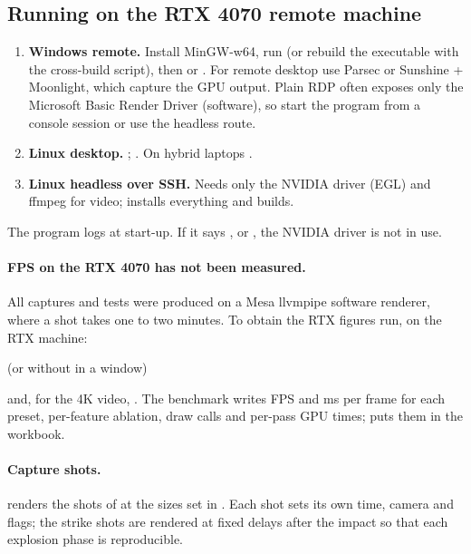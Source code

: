 \subsection{Running on the RTX 4070 remote machine}
\begin{enumerate}
  \item \textbf{Windows remote.} Install MinGW-w64, run  (or rebuild the executable with the cross-build script), then
   or . For remote desktop use Parsec or Sunshine + Moonlight, which capture the GPU output. Plain RDP often
  exposes only the Microsoft Basic Render Driver (software), so start the program from a console session or use the headless route.
  \item \textbf{Linux desktop.} ; . On hybrid laptops
  .
  \item \textbf{Linux headless over SSH.} Needs only the NVIDIA driver (EGL) and ffmpeg for video;  installs everything and builds.
\end{enumerate}
The program logs  at start-up. If it says ,  or , the NVIDIA driver is not in use.

\paragraph{FPS on the RTX 4070 has not been measured.} All captures and tests were produced on a Mesa llvmpipe software renderer, where
a shot takes one to two minutes. To obtain the RTX figures run, on the RTX machine:
\begin{center}\small
{}\quad (or without  in a window)
\end{center}
and, for the 4K video, .
The benchmark writes FPS and ms per frame for each preset, per-feature ablation, draw calls and per-pass GPU times;  puts them in the workbook.

\paragraph{Capture shots.}  renders the shots of  at the sizes set in . Each shot sets its own time, camera
and flags; the strike shots are rendered at fixed delays after the impact so that each explosion phase is reproducible.
